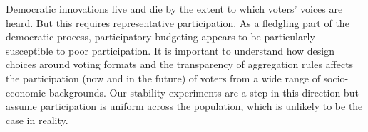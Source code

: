 \documentclass[runningheads]{llncs}
\newcommand{\kibitz}[2]{\ifnum\Comments=1{\color{#1}{#2}}\fi}
\newcommand{\gb}[1]{\kibitz{brown}{[GB:#1]}}
\newcommand{\mes}{ES}
\begin{document}
Democratic innovations live and die by the extent to which voters' voices are heard. But this requires representative participation. %
As a fledgling part of the democratic process, participatory budgeting appears to be particularly susceptible to poor participation. It is important to understand how   design choices around voting formats and the transparency of aggregation rules affects the participation (now and in the future) of voters from a wide range of socio-economic backgrounds. Our stability experiments are a step in this direction but assume participation is uniform across the population, which is unlikely to be the case in reality. 






\end{document}
